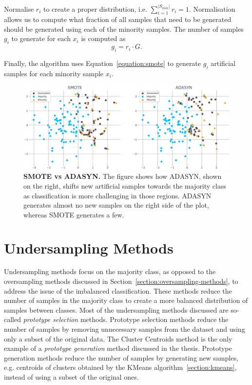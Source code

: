 Normalise $r_i$ to create a proper distribution, i.e. $\sum_{i = 1}^{\lvert S_{min} \rvert} r_i =
1$. Normalisation allows us to compute what fraction of all samples that need to be generated
should be generated using each of the minority samples. The number of samples $g_i$ to generate for
each $x_i$ is computed as
\begin{equation}
    g_i = r_i \cdot G.
\end{equation}

Finally, the algorithm uses Equation~\ref{equation:smote} to generate $g_i$ artificial samples for
each minority sample $x_i$.

\begin{figure}
    \centering
    \includegraphics[width=\linewidth]{figures/smote_vs_adasyn.eps}
    \caption{
        \textbf{SMOTE vs ADASYN.} The figure shows how ADASYN, shown on the right, shifts new
        artificial samples towards the majority class as classification is more challenging in
        those regions. ADASYN generates almost no new samples on the right side of the plot,
        whereas SMOTE generates a few.
    }
    \label{figure:smote-vs-adasyn}
\end{figure}


\section{Undersampling Methods}
\label{section:undersampling-methods}

Undersampling methods focus on the majority class, as opposed to the oversampling methods discussed
in Section~\ref{section:oversampling-methods}, to address the issue of the imbalanced
classification. These methods reduce the number of samples in the majority class to create a more
balanced distribution of samples between classes. Most of the undersampling methods discussed are
so-called \emph{prototype selection} methods. Prototype selection methods reduce the number of
samples by removing unnecessary samples from the dataset and using only a subset of the original
data. The Cluster Centroids method is the only example of a \emph{prototype generation} method
discussed in the thesis. Prototype generation methods reduce the number of samples by generating
new samples, e.g. centroids of clusters obtained by the KMeans algorithm~\ref{section:kmeans},
instead of using a subset of the original ones.


